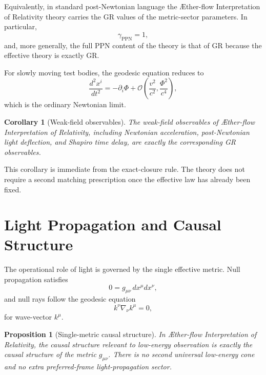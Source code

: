 \documentclass[11pt]{article}
\newcommand{\Aflow}{\AE{}ther-flow}
\newcommand{\TheoryName}{\Aflow{} Interpretation of Relativity}
\newtheorem{proposition}{Proposition}
\newtheorem{corollary}{Corollary}
\begin{document}
Equivalently, in standard post-Newtonian language the \TheoryName{} theory carries the GR values of the metric-sector parameters. In particular,
\begin{equation}
\gamma_{\mathrm{PPN}} = 1,
\label{eq:ppngamma}
\end{equation}
and, more generally, the full PPN content of the theory is that of GR because the effective theory is exactly GR.

For slowly moving test bodies, the geodesic equation reduces to
\begin{equation}
\frac{d^2x^i}{dt^2}
=
-\partial_i\Phi
+ \mathcal{O}\!\left(\frac{v^2}{c^2},\frac{\Phi^2}{c^4}\right),
\label{eq:newtonianlimit}
\end{equation}
which is the ordinary Newtonian limit.

\begin{corollary}[Weak-field observables]
The weak-field observables of \TheoryName{}, including Newtonian acceleration, post-Newtonian light deflection, and Shapiro time delay, are exactly the corresponding GR observables.
\end{corollary}

This corollary is immediate from the exact-closure rule. The theory does not require a second matching prescription once the effective law has already been fixed.

\section{Light Propagation and Causal Structure}

The operational role of light is governed by the single effective metric. Null propagation satisfies
\begin{equation}
0=g_{\mu\nu}\,dx^\mu dx^\nu,
\label{eq:null}
\end{equation}
and null rays follow the geodesic equation
\begin{equation}
k^\nu \nabla_\nu k^\mu = 0,
\label{eq:nullgeodesic}
\end{equation}
for wave-vector \(k^\mu\).

\begin{proposition}[Single-metric causal structure]
In \TheoryName{}, the causal structure relevant to low-energy observation is exactly the causal structure of the metric \(g_{\mu\nu}\). There is no second universal low-energy cone and no extra preferred-frame light-propagation sector.
\end{proposition}
\end{document}
